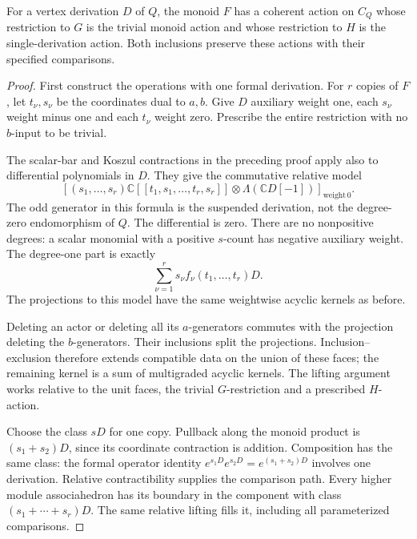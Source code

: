 \begin{lemma}\label{cycen:lem:relative-action}
For a vertex derivation $D$ of $Q$, the monoid $F$
has a coherent action on $C_Q$ whose restriction
to $G$ is the trivial monoid action and whose
restriction to $H$ is the single-derivation action.
Both inclusions preserve these actions with their
specified comparisons.
\end{lemma}
\begin{proof}
First construct the operations with one formal
derivation. For $r$ copies of $F$, let $t_\nu,s_\nu$
be the coordinates dual to $a,b$. Give $D$ auxiliary
weight one, each $s_\nu$ weight minus one and each
$t_\nu$ weight zero. Prescribe the entire restriction
with no $b$-input to be trivial.

The scalar-bar and Koszul contractions in the preceding
proof apply also to differential polynomials in $D$.
They give the commutative relative model
\begin{equation}\label{cycen:eq:relative-derivation}
 \left[(s_1,\ldots,s_r)
 \mathbb C[[t_1,s_1,\ldots,t_r,s_r]]
                       \otimes\Lambda(\mathbb C D[-1])
 \right]_{\mathrm{weight}\,0}.
\end{equation}
The odd generator in this formula is the suspended
derivation, not the degree-zero endomorphism of $Q$.
The differential is zero. There are no nonpositive
degrees: a scalar monomial with a positive $s$-count
has negative auxiliary weight. The degree-one part is
exactly
\[
       \sum_{\nu=1}^r s_\nu f_\nu(t_1,\ldots,t_r)D.
\]
The projections to this model have the same
weightwise acyclic kernels as before.

Deleting an actor or deleting all its $a$-generators
commutes with the projection deleting the $b$-generators.
Their inclusions split the projections.
Inclusion--exclusion therefore extends compatible data
on the union of these faces; the remaining kernel is
a sum of multigraded acyclic kernels. The lifting
argument works relative to the unit faces, the
trivial $G$-restriction and a prescribed $H$-action.

Choose the class $sD$ for one copy. Pullback along the
monoid product is $(s_1+s_2)D$, since its coordinate
contraction is addition. Composition has the same
class: the formal operator identity
$e^{s_1D}e^{s_2D}=e^{(s_1+s_2)D}$ involves one
derivation. Relative contractibility supplies the
comparison path. Every higher module associahedron
has its boundary in the component with class
$(s_1+\cdots+s_r)D$. The same relative lifting fills
it, including all parameterized comparisons.


\end{proof}
